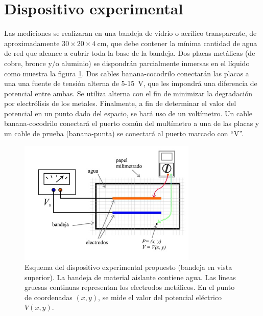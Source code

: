 \documentclass[laboratorio]{guia}
\begin{document}
\section{Dispositivo experimental}
Las mediciones se realizaran en una bandeja de vidrio o acrílico transparente, de aproximadamente \(30 \times 20 \times \SI{4}{\centi\metre}\), que debe contener la mínima cantidad de agua de red que alcance a cubrir toda la base de la bandeja. 
Dos placas metálicas (de cobre, bronce y/o aluminio) se dispondrán parcialmente inmersas en el líquido como muestra la figura \ref{fig:1}.
Dos cables banana-cocodrilo conectarán las placas a una una fuente de tensión alterna de \num{5}-\SI{15}{\volt}, que les impondrá una diferencia de potencial entre ambas.
Se utiliza alterna con el fin de minimizar la degradación por electrólisis de los metales.
Finalmente, a fin de determinar el valor del potencial en un punto dado del espacio, se hará uso de un voltímetro.
Un cable banana-cocodrilo conectará el puerto común del multímetro a una de las placas y un cable de prueba (banana-punta) se conectará al puerto marcado con ``V''.
\begin{figure}[ht!]
  \centering
    \includegraphics[width=8.5cm]{LG01--000.png}
    \caption{Esquema del dispositivo experimental propuesto (bandeja en vista superior).
	  La bandeja de material aislante contiene agua. Las líneas gruesas continuas representan los electrodos metálicos.
	  En el punto de coordenadas \((x,y)\), se mide el valor del potencial eléctrico \(V(x,y)\).}
    \label{fig:1}
\end{figure}
\end{document}
